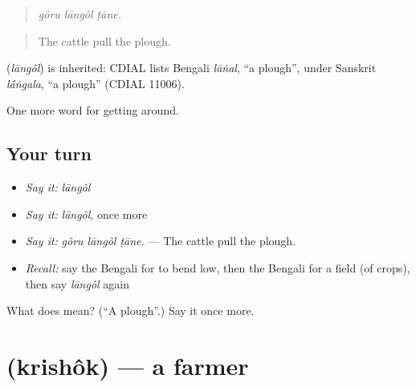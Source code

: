 \begin{quote}
  
\end{quote}

\begin{quote}
\emph{gôru lāngôl ṭāne.}
\end{quote}

\begin{quote}
The cattle pull the plough.
\end{quote}

\begin{cousinweb}
\textbf{} (\emph{lāngôl}) is inherited: CDIAL lists Bengali \emph{lāṅal}, \textquotedblleft{}a plough\textquotedblright{}, under Sanskrit \emph{l\'{\={a}}ṅgala}, \textquotedblleft{}a plough\textquotedblright{} (CDIAL 11006).
\end{cousinweb}

\begin{grammarlens}[title={What you've built}]
One more word for getting around.
\end{grammarlens}

\subsection*{Your turn}
\begin{itemize}
\raggedright
  \item \emph{Say it:} \emph{lāngôl}
  \item \emph{Say it:} \emph{lāngôl}, once more
  \item \emph{Say it:} \emph{gôru lāngôl ṭāne.} — The cattle pull the plough.
  \item \emph{Recall:} say the Bengali for to bend low, then the Bengali for a field (of crops), then say \emph{lāngôl} again
\end{itemize}

\begin{tcolorbox}[breakable,colback=teal!4,colframe=teal!35!black,title={Before you move on}]
What does  mean? (\textquotedblleft{}A plough\textquotedblright{}.) Say it once more.
\end{tcolorbox}
\section[\texorpdfstring{\bn{কৃষক} (krishôk)}{কৃষক (krishôk)}]{ (krishôk) — a farmer}

\label{lesson:BN-C430-krishok}



